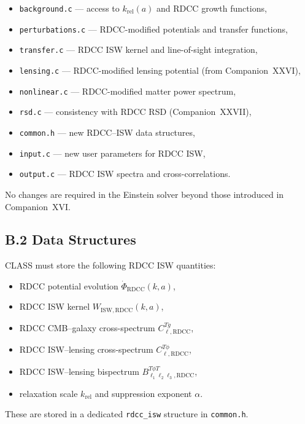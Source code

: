 \documentclass[11pt,a4paper]{article}
\begin{document}
\begin{itemize}
    \item \texttt{background.c} — access to $k_{\mathrm{rel}}(a)$ and RDCC growth functions,
    \item \texttt{perturbations.c} — RDCC-modified potentials and transfer functions,
    \item \texttt{transfer.c} — RDCC ISW kernel and line-of-sight integration,
    \item \texttt{lensing.c} — RDCC-modified lensing potential (from Companion~XXVI),
    \item \texttt{nonlinear.c} — RDCC-modified matter power spectrum,
    \item \texttt{rsd.c} — consistency with RDCC RSD (Companion~XXVII),
    \item \texttt{common.h} — new RDCC–ISW data structures,
    \item \texttt{input.c} — new user parameters for RDCC ISW,
    \item \texttt{output.c} — RDCC ISW spectra and cross-correlations.
\end{itemize}

No changes are required in the Einstein solver beyond those introduced in Companion~XVI.

\subsection*{B.2 Data Structures}

CLASS must store the following RDCC ISW quantities:

\begin{itemize}
    \item RDCC potential evolution $\dot{\Phi}_{\mathrm{RDCC}}(k,a)$,
    \item RDCC ISW kernel $W_{\mathrm{ISW,RDCC}}(k,a)$,
    \item RDCC CMB–galaxy cross-spectrum $C_{\ell,\mathrm{RDCC}}^{Tg}$,
    \item RDCC ISW–lensing cross-spectrum $C_{\ell,\mathrm{RDCC}}^{T\phi}$,
    \item RDCC ISW–lensing bispectrum $B_{\ell_{1}\ell_{2}\ell_{3},\mathrm{RDCC}}^{T\phi T}$,
    \item relaxation scale $k_{\mathrm{rel}}$ and suppression exponent $\alpha$.
\end{itemize}

These are stored in a dedicated \texttt{rdcc\_isw} structure in \texttt{common.h}.
\end{document}
